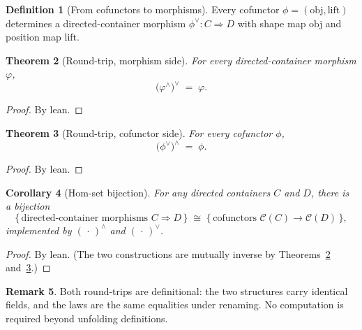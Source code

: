 \documentclass[11pt,a4paper]{article}
\theoremstyle{plain}
\newtheorem{theorem}{Theorem}[section]
\newtheorem{corollary}[theorem]{Corollary}
\theoremstyle{definition}
\newtheorem{definition}[theorem]{Definition}
\newtheorem{remark}[theorem]{Remark}
\newcommand{\cat}{\mathcal{C}}
\begin{document}
\begin{definition}[From cofunctors to morphisms]\label{def:to-dcont}
Every cofunctor $\phi=(\mathrm{obj},\mathrm{lift})$ determines a
directed-container morphism $\phi^\vee:C\Rightarrow D$ with shape map
$\mathrm{obj}$ and position map $\mathrm{lift}$.
\end{definition}

\begin{theorem}[Round-trip, morphism side]\label{thm:rt-morph}
For every directed-container morphism $\varphi$,
\begin{equation}
  \bigl(\varphi^\wedge\bigr)^\vee \;=\; \varphi.
\end{equation}
\end{theorem}

\begin{proof}
By lean.
\end{proof}

\begin{theorem}[Round-trip, cofunctor side]\label{thm:rt-cof}
For every cofunctor $\phi$,
\begin{equation}
  \bigl(\phi^\vee\bigr)^\wedge \;=\; \phi.
\end{equation}
\end{theorem}

\begin{proof}
By lean.
\end{proof}

\begin{corollary}[Hom-set bijection]\label{cor:hom-bij}
For any directed containers $C$ and $D$, there is a bijection
\begin{equation}
  \bigl\{\,\text{directed-container morphisms } C\Rightarrow D\,\bigr\}
  \;\cong\;
  \bigl\{\,\text{cofunctors } \cat(C)\to\cat(D)\,\bigr\},
\end{equation}
implemented by $(\,\cdot\,)^\wedge$ and $(\,\cdot\,)^\vee$.
\end{corollary}

\begin{proof}
By lean. (The two constructions are mutually inverse by
Theorems~\ref{thm:rt-morph} and~\ref{thm:rt-cof}.)
\end{proof}

\begin{remark}
Both round-trips are definitional: the two structures carry identical fields,
and the laws are the same equalities under renaming. No computation is
required beyond unfolding definitions.
\end{remark}
\end{document}
